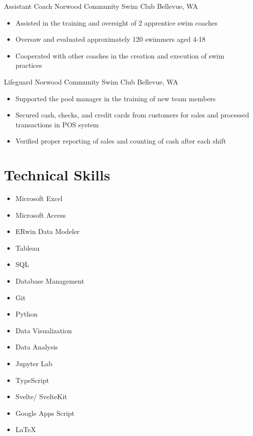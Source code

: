\documentclass[10pt]{resume}
\begin{document}
{Assistant Coach}
{Norwood Community Swim Club}
{Bellevue, WA}
{
    \begin{itemize}
        \item Assisted in the training and oversight of 2 apprentice swim coaches

        \item Oversaw and evaluated approximately 120 swimmers aged 4-18

        \item Cooperated with other coaches in the creation and execution of swim practices
    \end{itemize}
}

{Lifeguard}
{Norwood Community Swim Club}
{Bellevue, WA}
{
    \begin{itemize}
        \item Supported the pool manager in the training of new team members

        \item Secured cash, checks, and credit cards from customers for sales and processed transactions in POS system

        \item Verified proper reporting of sales and counting of cash after each shift
    \end{itemize}
}

\section{Technical Skills}
\begin{multicols}{4}
    \raggedright
    \begin{itemize}[leftmargin=3em]
        \item Microsoft Excel
        \item Microsoft Access
        \item ERwin Data Modeler
        \item Tableau
              \columnbreak
        \item SQL
        \item Database Management
        \item Git
              \columnbreak
        \item Python
        \item Data Visualization
        \item Data Analysis
        \item Jupyter Lab
              \columnbreak
        \item TypeScript
        \item Svelte/ SvelteKit
        \item Google Apps Script
        \item LaTeX
    \end{itemize}
\end{multicols}
\end{document}
